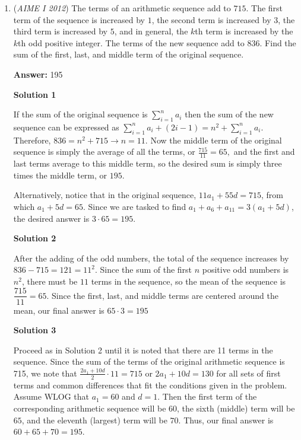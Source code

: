 \begin{enumerate}
 \href{https://artofproblemsolving.com/videos/amc/2012aimei/289}{https://artofproblemsolving.com/videos/amc/2012aimei/289}

 


	\item (\textit{AIME I 2012}) The terms of an arithmetic sequence add to $715$. The first term of the sequence is increased by $1$, the second term is increased by $3$, the third term is increased by $5$, and in general, the $k$th term is increased by the $k$th odd positive integer. The terms of the new sequence add to $836$. Find the sum of the first, last, and middle term of the original sequence.


 
 \textbf{Answer: }195



\textbf{Solution 1}

If the sum of the original sequence is $\sum_{i=1}^{n} a_i$ then the sum of the new sequence can be expressed as $\sum_{i=1}^{n} a_i + (2i - 1) = n^2 + \sum_{i=1}^{n} a_i.$ Therefore, $836 = n^2 + 715 \rightarrow n=11.$ Now the middle term of the original sequence is simply the average of all the terms, or $\frac{715}{11} = 65,$ and the first and last terms average to this middle term, so the desired sum is simply three times the middle term, or $\boxed{195}.$

 
Alternatively, notice that in the original sequence, $11a_1 + 55d = 715$, from which $a_1 + 5d = 65$. Since we are tasked to find $a_1 + a_6 + a_{11} = 3(a_1 + 5d)$, the desired answer is $3 \cdot 65 = \boxed{195}.$




\textbf{Solution 2}

After the adding of the odd numbers, the total of the sequence increases by $836 - 715 = 121 = 11^2$. Since the sum of the first $n$ positive odd numbers is $n^2$, there must be $11$ terms in the sequence, so the mean of the sequence is $\dfrac{715}{11} = 65$. Since the first, last, and middle terms are centered around the mean, our final answer is $65 \cdot 3 = \boxed{195}$




\textbf{Solution 3}

Proceed as in Solution 2 until it is noted that there are 11 terms in the sequence. Since the sum of the terms of the original arithmetic sequence is 715, we note that $\frac{2a_1 + 10d}{2} \cdot 11 = 715$ or $2a_1 + 10d = 130$ for all sets of first terms and common differences that fit the conditions given in the problem. Assume WLOG that $a_1 = 60$ and $d = 1$. Then the first term of the corresponding arithmetic sequence will be $60$, the sixth (middle) term will be $65$, and the eleventh (largest) term will be $70$. Thus, our final answer is $60 + 65 + 70 = \boxed{195}$.


\end{enumerate}
